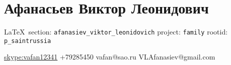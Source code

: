  
 
\section{Афанасьев Виктор Леонидович}

\vspace{0.5cm}
 {\ifDEBUG\small\LaTeX~section: \verb|afanasiev_viktor_leonidovich| project: \verb|family| rootid: \verb|p_saintrussia| \fi}
\vspace{0.5cm}

\begin{multicols}{2}
	\obeycr
			\url{skype:vafan12341}
			+79285450
			vafan@sao.ru
			VLAfanasiev@gmail.com
	\restorecr
\end{multicols}

